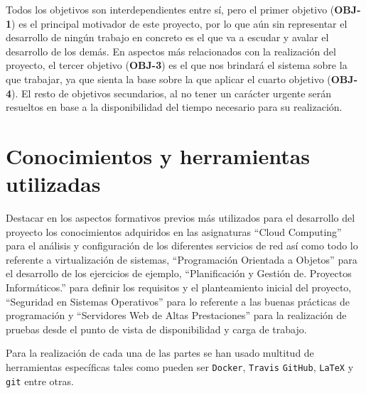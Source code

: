 Todos los objetivos son interdependientes entre sí, pero el primer objetivo (\textbf{OBJ-1}) es el principal motivador de este proyecto, por lo que aún sin representar el desarrollo de ningún trabajo en concreto es el que va a escudar y avalar el desarrollo de los demás. En aspectos más relacionados con la realización del proyecto, el tercer objetivo (\textbf{OBJ-3}) es el que nos brindará el sistema sobre la que trabajar, ya que sienta la base sobre la que aplicar el cuarto objetivo (\textbf{OBJ-4}). El resto de objetivos secundarios, al no tener un carácter urgente serán resueltos en base a la disponibilidad del tiempo necesario para su realización.

\section{Conocimientos y herramientas utilizadas}

\bigskip
Destacar en los aspectos formativos previos más utilizados para el desarrollo del proyecto los conocimientos adquiridos en las asignaturas ``Cloud Computing'' para el análisis y configuración de los diferentes servicios de red así como todo lo referente a virtualización de sistemas, ``Programación Orientada a Objetos'' para el desarrollo de los ejercicios de ejemplo, ``Planificación y Gestión de. Proyectos Informáticos.'' para definir los requisitos y el planteamiento inicial del proyecto, ``Seguridad en Sistemas Operativos'' para lo referente a las buenas prácticas de programación y ``Servidores Web de Altas Prestaciones'' para la realización de pruebas desde el punto de vista de disponibilidad y carga de trabajo.

Para la realización de cada una de las partes se han usado multitud de herramientas específicas tales como pueden ser \texttt{Docker}, \texttt{Travis} \texttt{GitHub}, \texttt{LaTeX} y \texttt{git} entre otras.
